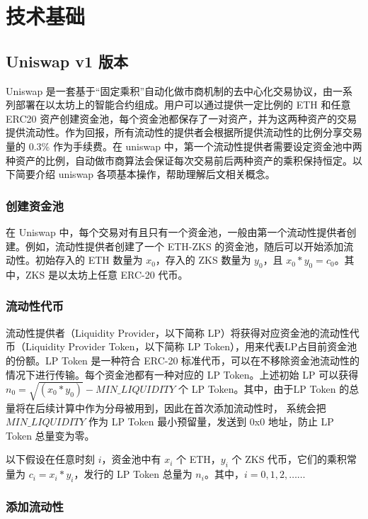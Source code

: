 \documentclass[]{template/llncs}
\begin{document}
\section{技术基础}

\subsection{Uniswap v1 版本}
Uniswap\cite{uniswapv1} 是一套基于“固定乘积”自动化做市商机制的去中心化交易协议，由一系列部署在以太坊上的智能合约组成。用户可以通过提供一定比例的 ETH 和任意 ERC20 资产创建资金池，每个资金池都保存了一对资产，并为这两种资产的交易提供流动性。作为回报，所有流动性的提供者会根据所提供流动性的比例分享交易量的 0.3\% 作为手续费。在 uniswap 中，第一个流动性提供者需要设定资金池中两种资产的比例，自动做市商算法会保证每次交易前后两种资产的乘积保持恒定。以下简要介绍 uniswap 各项基本操作，帮助理解后文相关概念。

\subsubsection{创建资金池}

在 Uniswap 中，每个交易对有且只有一个资金池，一般由第一个流动性提供者创建。例如，流动性提供者创建了一个 ETH-ZKS 的资金池，随后可以开始添加流动性。初始存入的 ETH 数量为 $x_0$，存入的 ZKS 数量为 $y_0$，且 $x_0*y_0 = c_0$。其中，ZKS 是以太坊上任意 ERC-20 代币。

\subsubsection{流动性代币}

流动性提供者（Liquidity Provider，以下简称 LP）将获得对应资金池的流动性代币（Liquidity Provider Token，以下简称 LP Token），用来代表LP占目前资金池的份额。LP Token 是一种符合 ERC-20 标准代币，可以在不移除资金池流动性的情况下进行传输。每个资金池都有一种对应的 LP Token。上述初始 LP 可以获得 $n_0 = \sqrt{(x_0*y_0)} - MIN\_LIQUIDITY$ 个 LP Token。其中，由于LP Token 的总量将在后续计算中作为分母被用到，因此在首次添加流动性时， 系统会把 $MIN\_LIQUIDITY$ 作为 LP Token 最小预留量，发送到 0x0 地址，防止 LP Token 总量变为零。

以下假设在任意时刻 $i$，资金池中有 $x_i$ 个 ETH，$y_i$ 个 ZKS 代币，它们的乘积常量为 $c_i = x_i *y_i$，发行的 LP Token 总量为 $n_i$。其中，$i = 0,1,2,……$

\subsubsection{添加流动性}
\end{document}
